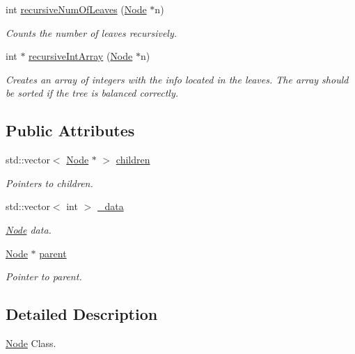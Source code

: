 \begin{DoxyCompactItemize}
int \hyperlink{class_node_a970755e7b9ff4a33fde5433663f06549}{recursive\-Num\-Of\-Leaves} (\hyperlink{class_node}{Node} $\ast$n)
\begin{DoxyCompactList}\small\item\em Counts the number of leaves recursively. \end{DoxyCompactList}\item 
int $\ast$ \hyperlink{class_node_ae0c0332615644c989be5c8137b4109a5}{recursive\-Int\-Array} (\hyperlink{class_node}{Node} $\ast$n)
\begin{DoxyCompactList}\small\item\em Creates an array of integers with the info located in the leaves. The array should be sorted if the tree is balanced correctly. \end{DoxyCompactList}\end{DoxyCompactItemize}
\subsection*{Public Attributes}
\begin{DoxyCompactItemize}
\item 
std\-::vector$<$ \hyperlink{class_node}{Node} $\ast$ $>$ \hyperlink{class_node_a49baf1d613dc14f1e1e4aad883dde6fe}{children}
\begin{DoxyCompactList}\small\item\em Pointers to children. \end{DoxyCompactList}\item 
std\-::vector$<$ int $>$ \hyperlink{class_node_aebcdeef2d940bb25316fd0eac5d51ed2}{\-\_\-data}
\begin{DoxyCompactList}\small\item\em \hyperlink{class_node}{Node} data. \end{DoxyCompactList}\item 
\hyperlink{class_node}{Node} $\ast$ \hyperlink{class_node_ad8184598cdea70e4bbdfd76f2b0f9e85}{parent}
\begin{DoxyCompactList}\small\item\em Pointer to parent. \end{DoxyCompactList}\end{DoxyCompactItemize}


\subsection{Detailed Description}
\hyperlink{class_node}{Node} Class. 

